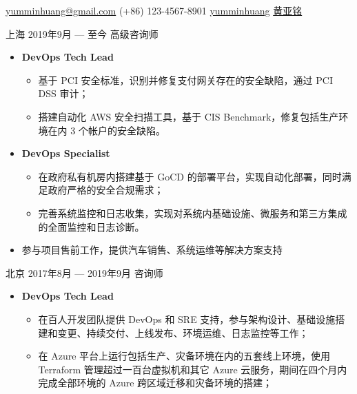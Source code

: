 \documentclass{resume}
\begin{document}
{\href{mailto:yumminhuang@gmail.com}{yumminhuang@gmail.com}}
{(+86) 123-4567-8901}
{\href{https://github.com/yumminhuang}{yumminhuang}}
{\href{https://www.linkedin.com/in/yaming-huang-6a09325b/zh-cn}{黄亚铭}}
{}

\begin{body}
	{上海}
	{2019年9月 --- 至今}
	{高级咨询师}
	\begin{itemize}[noitemsep,topsep=0pt]
		\item {} \textbf{DevOps Tech Lead}
		\begin{itemize}[noitemsep,topsep=0pt]
			\item 基于 PCI 安全标准，识别并修复支付网关存在的安全缺陷，通过 PCI DSS 审计；
			\item 搭建自动化 AWS 安全扫描工具，基于 CIS Benchmark，修复包括生产环境在内 3 个帐户的安全缺陷。
		\end{itemize}
		\item {} \textbf{DevOps Specialist}
		\begin{itemize}[noitemsep,topsep=0pt]
			\item 在政府私有机房内搭建基于 GoCD 的部署平台，实现自动化部署，同时满足政府严格的安全合规需求；
			\item 完善系统监控和日志收集，实现对系统内基础设施、微服务和第三方集成的全面监控和日志诊断。
		\end{itemize}
		\item 参与项目售前工作，提供汽车销售、系统运维等解决方案支持
	\end{itemize}
	{北京}
	{2017年8月 --- 2019年9月}
	{咨询师}
	\begin{itemize}[noitemsep,topsep=0pt]
		\item {} \textbf{DevOps Tech Lead}
		\begin{itemize}[noitemsep,topsep=0pt]
			\item 在百人开发团队提供 DevOps 和 SRE 支持，参与架构设计、基础设施搭建和变更、持续交付、上线发布、环境运维、日志监控等工作；
			\item 在 Azure 平台上运行包括生产、灾备环境在内的五套线上环境，使用 Terraform 管理超过一百台虚拟机和其它 Azure 云服务，期间在四个月内完成全部环境的 Azure 跨区域迁移和灾备环境的搭建；

\end{itemize}
\end{itemize}
\end{body}
\end{document}
